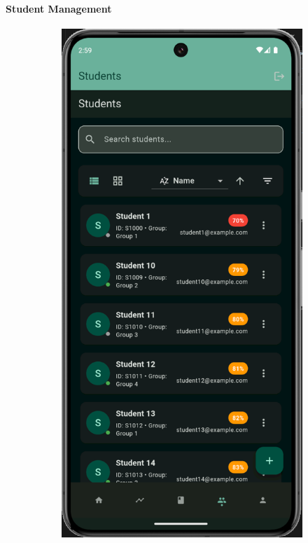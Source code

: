 \paragraph{Student Management}
\vspace{1cm}
\begin{figure}[H]
    \centering
    \begin{subfigure}[b]{0.48\textwidth}
        \includegraphics[width=\textwidth]{images/rachid/teacher-side-studentpage.png}

\end{subfigure}
\end{figure}
